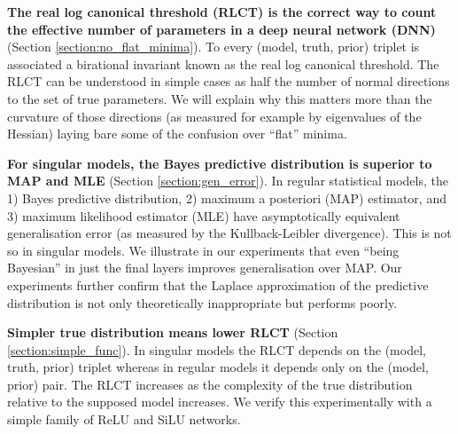 \documentclass{article} %
\begin{document}
\textbf{The real log canonical threshold (RLCT) is the correct way to count the effective number of parameters in a deep neural network (DNN)} (Section \ref{section:no_flat_minima}). 
    To every (model, truth, prior) triplet is associated a birational invariant known as the real log canonical threshold. The RLCT can be understood in simple cases as half the number of normal directions to the set of true parameters. We will explain why this matters more than the curvature of those directions (as measured for example by eigenvalues of the Hessian) laying bare some of the confusion over ``flat'' minima. 

\textbf{For singular models, the Bayes predictive distribution is superior to MAP and MLE} (Section \ref{section:gen_error}). In regular statistical models,  the 1) Bayes predictive distribution, 2) maximum {a posteriori} (MAP) estimator, and 3) maximum likelihood estimator (MLE) have asymptotically equivalent generalisation error (as measured by the Kullback-Leibler divergence). This is not so in singular models. We illustrate in our experiments that even ``being Bayesian'' in just the final layers improves generalisation over MAP. Our experiments further confirm that the Laplace approximation of the predictive distribution \citet{smith2017bayesian,zhang_energyentropy_2018} is not only theoretically inappropriate but performs poorly.

\textbf{Simpler true distribution means lower RLCT} (Section \ref{section:simple_func}). In singular models the RLCT depends on the (model, truth, prior) triplet whereas in regular models it depends only on the (model, prior) pair. The RLCT increases as the complexity of the true distribution relative to the supposed model increases. We verify this experimentally with a simple family of ReLU and SiLU networks. 
\end{document}
